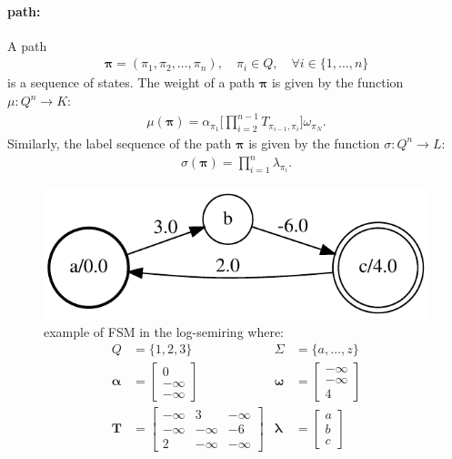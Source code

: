 \paragraph{path:} A path
\begin{align}
    \boldsymbol{\pi} = (\pi_1, \pi_2, \dots, \pi_n), \quad
        \pi_i \in Q, \quad \forall i \in \{1, \dots, n \}
\end{align}
is a sequence of states. The weight of a path $\boldsymbol{\pi}$ is
given by the function $\mu: Q^n \rightarrow K$:
\begin{align}
    \mu(\boldsymbol{\pi}) = \alpha_{\pi_1} \Big[
        \prod_{i=2}^{n-1} T_{\pi_{i-1},\pi_i} \Big] \omega_{\pi_N}.
\end{align}
Similarly, the label sequence of the path $\boldsymbol{\pi}$ is given
by the function $\sigma: Q^n \rightarrow L$:
\begin{align}
    \sigma(\boldsymbol{\pi}) = \prod_{i=1}^n \lambda_{\pi_i}.
\end{align}

\begin{figure}[t]
    \centering
    \includegraphics[scale=0.6]{images/fsm1.pdf}
    \captionsetup{singlelinecheck=off}
    \caption[example/fsm1]{example of FSM in the log-semiring where:
    \begin{align}
        Q &= \{1, 2, 3\} & \Sigma &= \{a, \dots, z\} \\
        \boldsymbol{\alpha} &= \begin{bmatrix}
            0 \\
            -\infty \\
            -\infty
        \end{bmatrix} &
        \boldsymbol{\omega} &= \begin{bmatrix}
            -\infty \\
            -\infty \\
            4
        \end{bmatrix} \\
        \mathbf{T} &= \begin{bmatrix}
            -\infty & 3 & -\infty \\
            -\infty & -\infty & -6 \\
            2 & -\infty & -\infty
        \end{bmatrix} &
        \boldsymbol{\lambda} &= \begin{bmatrix}
            a \\
            b \\
            c
        \end{bmatrix}
    \end{align}}
    \label{fsm:fig:example1}
\end{figure}

